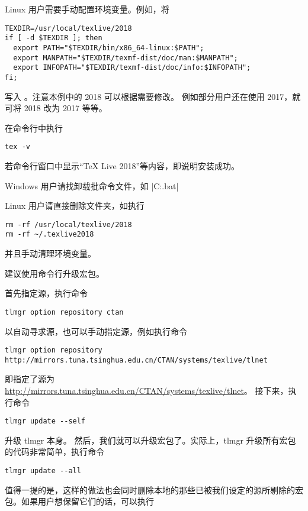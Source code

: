 Linux 用户需要手动配置环境变量。例如，将
\begin{verbatim}
TEXDIR=/usr/local/texlive/2018
if [ -d $TEXDIR ]; then
  export PATH="$TEXDIR/bin/x86_64-linux:$PATH";
  export MANPATH="$TEXDIR/texmf-dist/doc/man:$MANPATH";
  export INFOPATH="$TEXDIR/texmf-dist/doc/info:$INFOPATH";
fi;
\end{verbatim}
写入 。注意本例中的 2018 可以根据需要修改。
例如部分用户还在使用 \TeXLive{} 2017，就可将 2018 改为 2017 等等。



在命令行中执行
\begin{verbatim}
tex -v
\end{verbatim}
若命令行窗口中显示“TeX Live 2018”等内容，即说明安装成功。



Windows 用户请找卸载批命令文件，如 |C:\texlive{}\tlpkg\installer\uninst.bat|

Linux 用户请直接删除文件夹，如执行
\begin{verbatim}
rm -rf /usr/local/texlive/2018
rm -rf ~/.texlive2018
\end{verbatim}
并且手动清理环境变量。



建议使用命令行升级宏包。

首先指定源，执行命令
\begin{verbatim}
tlmgr option repository ctan
\end{verbatim}
以自动寻求源，也可以手动指定源，例如执行命令
\begin{verbatim}
tlmgr option repository http://mirrors.tuna.tsinghua.edu.cn/CTAN/systems/texlive/tlnet
\end{verbatim}
即指定了源为 \url{http://mirrors.tuna.tsinghua.edu.cn/CTAN/systems/texlive/tlnet}。
接下来，执行命令
\begin{verbatim}
tlmgr update --self
\end{verbatim}

升级 tlmgr 本身。 然后，我们就可以升级宏包了。实际上，tlmgr
升级所有宏包的代码非常简单，执行命令
\begin{verbatim}
tlmgr update --all
\end{verbatim}

值得一提的是，这样的做法也会同时删除本地的那些已被我们设定的源所剔除的宏包。如果用户想保留它们的话，可以执行

